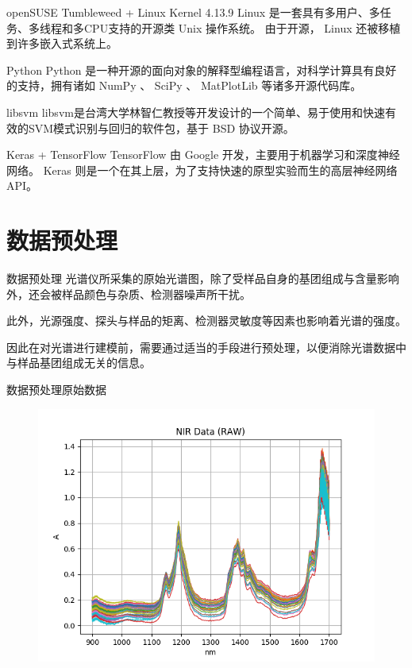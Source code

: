 \documentclass[11pt]{beamer}
\begin{document}
	\begin{frame}
		\begin{block}{openSUSE Tumbleweed + Linux Kernel 4.13.9}
			Linux 是一套具有多用户、多任务、多线程和多CPU支持的开源类 Unix 操作系统。
			由于开源， Linux 还被移植到许多嵌入式系统上。
		\end{block}
		\begin{block}{Python}
			Python 是一种开源的面向对象的解释型编程语言，对科学计算具有良好的支持，拥有诸如 NumPy 、 SciPy 、 MatPlotLib 等诸多开源代码库。
		\end{block}
		\begin{block}{libsvm}
			libsvm是台湾大学林智仁教授等开发设计的一个简单、易于使用和快速有效的SVM模式识别与回归的软件包，基于 BSD 协议开源。
		\end{block}
		\begin{block}{Keras + TensorFlow}
			TensorFlow 由 Google 开发，主要用于机器学习和深度神经网络。
			Keras 则是一个在其上层，为了支持快速的原型实验而生的高层神经网络 API。
		\end{block}
	\end{frame}
	\section{数据预处理}
	\begin{frame}{数据预处理}
		光谱仪所采集的原始光谱图，除了受样品自身的基团组成与含量影响外，还会被样品颜色与杂质、检测器噪声所干扰。
		
		此外，光源强度、探头与样品的矩离、检测器灵敏度等因素也影响着光谱的强度。
		
		因此在对光谱进行建模前，需要通过适当的手段进行预处理，以便消除光谱数据中与样品基团组成无关的信息。	
	\end{frame}
	\begin{frame}{数据预处理}{原始数据}
		\begin{figure}
			\centering
			\includegraphics[height=0.7\textheight]{../img/raw}
		\end{figure}
	\end{frame}
	
\end{document}
